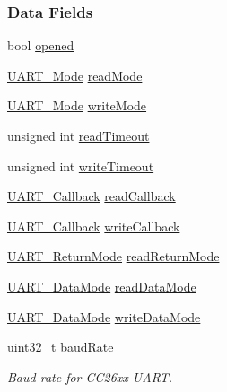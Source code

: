 \subsubsection*{Data Fields}
\begin{DoxyCompactItemize}
\item 
bool \hyperlink{struct_u_a_r_t_c_c26_x_x___object_aabff5933f6661e2ebdbd8b001a6c12d7}{opened}
\item 
\hyperlink{_u_a_r_t_8h_a2507a620dba95cd20885c52494d19e90}{U\+A\+R\+T\+\_\+\+Mode} \hyperlink{struct_u_a_r_t_c_c26_x_x___object_a6f41cd73c5e6a1ea8ccc0a45bc588043}{read\+Mode}
\item 
\hyperlink{_u_a_r_t_8h_a2507a620dba95cd20885c52494d19e90}{U\+A\+R\+T\+\_\+\+Mode} \hyperlink{struct_u_a_r_t_c_c26_x_x___object_abd7189770beb245f88ba363b64bc2924}{write\+Mode}
\item 
unsigned int \hyperlink{struct_u_a_r_t_c_c26_x_x___object_a001dd8b9c060037c53d19b79e32d1ee0}{read\+Timeout}
\item 
unsigned int \hyperlink{struct_u_a_r_t_c_c26_x_x___object_a55b3ddd718d4de0aeffd2426c3f14efd}{write\+Timeout}
\item 
\hyperlink{_u_a_r_t_8h_a44620a9d91e0357ebc6f0a79984d9e1e}{U\+A\+R\+T\+\_\+\+Callback} \hyperlink{struct_u_a_r_t_c_c26_x_x___object_a4811ff5ec74aca1f4085d7c6ec03d25e}{read\+Callback}
\item 
\hyperlink{_u_a_r_t_8h_a44620a9d91e0357ebc6f0a79984d9e1e}{U\+A\+R\+T\+\_\+\+Callback} \hyperlink{struct_u_a_r_t_c_c26_x_x___object_af1042c19f71eaf88f30c6c747cd10974}{write\+Callback}
\item 
\hyperlink{_u_a_r_t_8h_acb5a82843435a1b5d51b6c27028d914f}{U\+A\+R\+T\+\_\+\+Return\+Mode} \hyperlink{struct_u_a_r_t_c_c26_x_x___object_ad70982f98db142d1b7e2daae892cef0a}{read\+Return\+Mode}
\item 
\hyperlink{_u_a_r_t_8h_a694090fdb166f94ac30b809f9cba87b8}{U\+A\+R\+T\+\_\+\+Data\+Mode} \hyperlink{struct_u_a_r_t_c_c26_x_x___object_a6356ee769243af84a67e767108930777}{read\+Data\+Mode}
\item 
\hyperlink{_u_a_r_t_8h_a694090fdb166f94ac30b809f9cba87b8}{U\+A\+R\+T\+\_\+\+Data\+Mode} \hyperlink{struct_u_a_r_t_c_c26_x_x___object_a0b1a8cc79747676e8c9f465ef145359e}{write\+Data\+Mode}
\item 
uint32\+\_\+t \hyperlink{struct_u_a_r_t_c_c26_x_x___object_aae59e30e9a676337e5ae02a378ffe6d8}{baud\+Rate}
\begin{DoxyCompactList}\small\item\em Baud rate for C\+C26xx U\+A\+R\+T. \end{DoxyCompactList}\item 

\end{DoxyCompactItemize}
